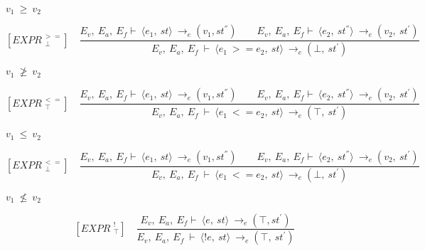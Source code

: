 	
	\begin{math}		
		v_1 \ \ge \ v_2		
	\end{math} 
	
	
	
	
	
	
	
	
	\[	
	[EXPR^{\ >=}_{\ \ \bot}] \quad	
	\dfrac{E_v, \ E_a, \ E_f \vdash \ \langle e_1, \ st \rangle \ \rightarrow_e (v_1, st^{''}) \qquad E_v, \ E_a, \ E_f \vdash \ \langle e_2, \ st^{''} \rangle \ \rightarrow_e (v_2, \ st^{'})}{E_v, \ E_a, \ E_f \ \vdash \ \langle e_1 \ >= e_2, \ st \rangle \ \rightarrow_e (\bot, \ st^{'})}	
	\]
	
	
	\begin{math}		
		v_1 \ \ngeq \ v_2		
	\end{math}
	
	
	
	
	
	\[
	[EXPR^{\ <=}_{\ \ \top}] \quad
	\dfrac{E_v, \ E_a, \ E_f \vdash \ \langle e_1, \ st \rangle \ \rightarrow_e (v_1, st^{''}) \qquad E_v, \ E_a, \ E_f \vdash \ \langle e_2, \ st^{''} \rangle \ \rightarrow_e (v_2, \ st^{'})}{E_v, \ E_a, \ E_f \ \vdash \ \langle e_1 \ <= e_2, \ st \rangle \ \rightarrow_e (\top, \ st^{'})}
	\]
	
	
	\begin{math}		
		v_1 \ \le \ v_2		
	\end{math} 
	
	
	
	
	
	
	
	
	\[	
	[EXPR^{\ <=}_{\ \ \bot}] \quad	
	\dfrac{E_v, \ E_a, \ E_f \vdash \ \langle e_1, \ st \rangle \ \rightarrow_e (v_1, st^{''}) \qquad E_v, \ E_a, \ E_f \vdash \ \langle e_2, \ st^{''} \rangle \ \rightarrow_e (v_2, \ st^{'})}{E_v, \ E_a, \ E_f \ \vdash \ \langle e_1 \ <= e_2, \ st \rangle \ \rightarrow_e (\bot, \ st^{'})}	
	\]
	
	
	\begin{math}		
		v_1 \ \nleq \ v_2		
	\end{math}
	
	
	
	
	
	\[	
	[EXPR^{\ \ !}_{\ \ \top}] \quad	
	\dfrac{E_v, \ E_a, \ E_f \vdash \ \langle e, \ st \rangle \ \rightarrow_e (\top, st^{'})}{E_v, \ E_a, \ E_f \ \vdash \ \langle !e, \ st \rangle \ \rightarrow_e (\top, \ st^{'})}	
	\] 
	
	
	
	
	
